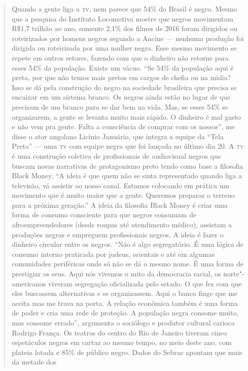 \begin{quote}
Quando a gente liga a \textsc{tv}, nem parece que 54\% do Brasil é negro. Mesmo
que a pesquisa do Instituto Locomotiva mostre que negros movimentam
R\$1,7 trilhão ao ano, somente 2,1\% dos filmes de 2016 foram dirigidos
ou roteirizados por homens negros segundo a Ancine --- nenhuma produção
foi dirigida ou roteirizada por uma mulher negra. Esse mesmo movimento
se repete em outros setores, fazendo com que o dinheiro não retorne para
esses 54\% da população. Existe um vácuo. ``Se 54\% da população aqui é
preta, por que não temos mais pretos em cargos de chefia ou na mídia?
Isso se dá pela construção do negro na sociedade brasileira que precisa
se encaixar em um sistema branco. Os negros ainda estão no lugar de que
precisam de um branco para se dar bem na vida. Mas, se esses 54\% se
organizarem, a gente se levanta muito mais rápido. O dinheiro é mal
gasto e não vem pra gente. Falta a consciência de comprar com os
nossos'', me disse o ator angolano Licínio Januário, que integra a
equipe da ``Tela Preta'' --- uma \textsc{tv} com equipe negra que foi lançada no
último dia 20. A \textsc{tv} é uma construção coletiva de profissionais de
audiovisual negros que buscam novas narrativas de protagonismo preto
tendo como base a filosofia Black Money. ``A ideia é que quem não se
sinta representado quando liga a televisão, vá assistir ao nosso canal.
Estamos colocando em prática um movimento que é muito maior que a gente.
Queremos preparar o terreno para a próxima geração.'' A ideia da
filosofia Black Money é criar uma forma de consumo consciente para que
negros consumam de afroempreendedores (desde roupas até atendimento
médico), assistam a produções negras e empreguem profissionais negros. A
ideia é fazer o dinheiro circular entre os negros. ``Não é algo
segregatório. É uma lógica de consumo interno praticada por judeus,
orientais e até em algumas comunidades periféricas onde só não se dá o
mesmo nome. É uma forma de prestigiar os seus. Aqui nós vivemos o mito
da democracia racial, os norte"-americanos viveram segregação
oficializada pelo estado. O que fez com que eles buscassem alternativas
e se organizassem. Aqui o banco finge que me aceita mas me trava na
porta. A relação econômica também é uma forma de poder e cria uma rede
de proteção. A população negra consome muito, mas consome errado'',
argumenta o sociólogo e produtor cultural carioca Rodrigo França. Os
teatros do centro do Rio de Janeiro tiveram cinco espetáculos negros em
cartaz ao mesmo tempo, no meio deste ano, com plateia lotada e 85\% de
público negro. Dados do Sebrae apontam que mais da metade dos

\end{quote}
